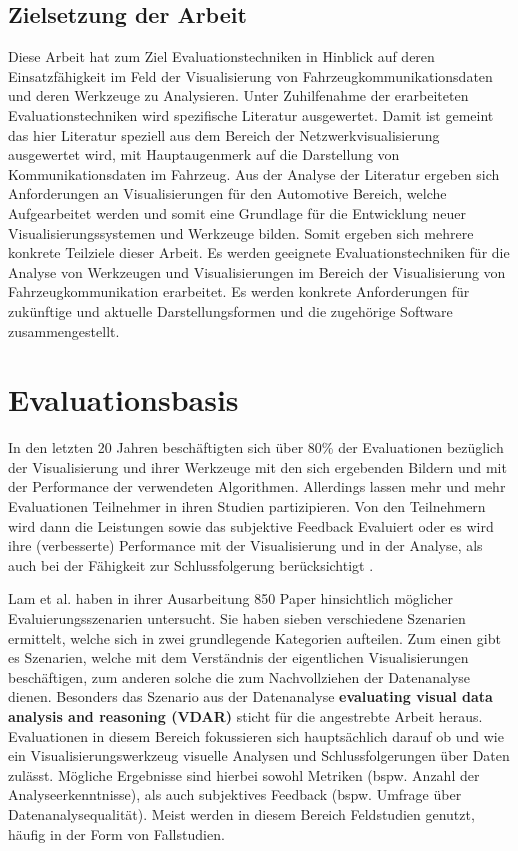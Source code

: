 \documentclass[draft=false
              ,paper=a4
              ,twoside=false
              ,fontsize=11pt
              ,headsepline
              ,BCOR10mm
              ,DIV11
              ]{scrbook}
\begin{document}
\section{Zielsetzung der Arbeit} %
\label{sec:zielsetzung_der_arbeit}
Diese Arbeit hat zum Ziel Evaluationstechniken in Hinblick auf deren Einsatzfähigkeit im Feld der Visualisierung von Fahrzeugkommunikationsdaten und deren Werkzeuge zu Analysieren. Unter Zuhilfenahme der erarbeiteten Evaluationstechniken wird spezifische Literatur ausgewertet. Damit ist gemeint das hier Literatur speziell aus dem Bereich der Netzwerkvisualisierung ausgewertet wird, mit Hauptaugenmerk auf die Darstellung von Kommunikationsdaten im Fahrzeug. Aus der Analyse der Literatur ergeben sich Anforderungen an Visualisierungen für den Automotive Bereich, welche Aufgearbeitet werden und somit eine Grundlage für die Entwicklung neuer Visualisierungssystemen und Werkzeuge bilden. 
Somit ergeben sich mehrere konkrete Teilziele dieser Arbeit. Es werden geeignete Evaluationstechniken für die Analyse von Werkzeugen und Visualisierungen im Bereich der Visualisierung von Fahrzeugkommunikation erarbeitet. Es werden konkrete Anforderungen für zukünftige und aktuelle Darstellungsformen und die zugehörige Software zusammengestellt.

\chapter{Evaluationsbasis} %
\label{cha:evaluationsbasis}
In den letzten 20 Jahren beschäftigten sich über 80\% der Evaluationen bezüglich der Visualisierung und ihrer Werkzeuge mit den sich ergebenden Bildern und mit der Performance der verwendeten Algorithmen. Allerdings lassen mehr und mehr Evaluationen Teilnehmer in ihren Studien partizipieren. Von den Teilnehmern wird dann die Leistungen sowie das subjektive Feedback Evaluiert oder es wird ihre (verbesserte) Performance mit der Visualisierung und in der Analyse, als auch bei der Fähigkeit zur Schlussfolgerung berücksichtigt \cite{isenberg_systematic_2013}. 

Lam et al. haben in ihrer Ausarbeitung \cite{lam_empirical_2012} 850 Paper hinsichtlich möglicher Evaluierungsszenarien untersucht. Sie haben sieben verschiedene Szenarien ermittelt, welche sich in zwei grundlegende Kategorien aufteilen. Zum einen gibt es Szenarien, welche mit dem Verständnis der eigentlichen Visualisierungen beschäftigen, zum anderen solche die zum Nachvollziehen der Datenanalyse dienen. Besonders das Szenario aus der Datenanalyse \textbf{evaluating visual data analysis and reasoning (VDAR)} sticht für die angestrebte Arbeit heraus. Evaluationen in diesem Bereich fokussieren sich hauptsächlich darauf ob und wie ein Visualisierungswerkzeug visuelle Analysen und Schlussfolgerungen über Daten zulässt. Mögliche Ergebnisse sind hierbei sowohl Metriken (bspw. Anzahl der Analyseerkenntnisse), als auch subjektives Feedback (bspw. Umfrage über Datenanalysequalität). Meist werden in diesem Bereich Feldstudien genutzt, häufig in der Form von Fallstudien.
\end{document}
